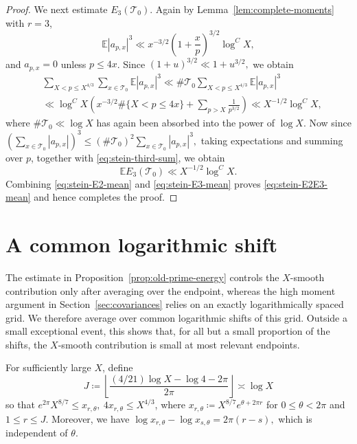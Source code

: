 \documentclass[a4paper,12pt,reqno]{amsart}
\numberwithin{equation}{section}
\theoremstyle{remark}
\newcommand{\E}{\mathbb{E}}
\begin{document}
\begin{proof}
We next estimate \(E_3(\mathcal T_0)\). Again by
Lemma~\ref{lem:complete-moments} with  $r=3$,
\[
 \E|a_{p,x}|^3
 \ll
 x^{-3/2}
 \left(1+\frac{x}{p}\right)^{3/2}
 \log^C X,
\]
and \(a_{p,x}=0\) unless \(p\leq4x\). Since
\(
 (1+u)^{3/2}\ll1+u^{3/2},
\)
we obtain
\begin{equation}\label{eq:stein-third-sum}
\begin{aligned}
 &\sum_{X<p\leq X^{4/3}}
 \sum_{x\in\mathcal T_0}\E|a_{p,x}|^3
 \ll \#\mathcal T_0 \sum_{X<p\leq X^{4/3}}\E|a_{p,x}|^3\\
 &\ll
 \log^C X
 \left(
 x^{-3/2}\#\{X<p\leq4x\}
 +
 \sum_{p>X}\frac1{p^{3/2}}
 \right)
 \ll X^{-1/2}\log^C X,
 \end{aligned}
\end{equation}
where  \(\#\mathcal T_0\ll\log X\) has again been absorbed
into the power of \(\log X\).
Now
since
\(
 \left(\sum_{x\in\mathcal T_0}|a_{p,x}|\right)^3
 \leq
 (\#\mathcal T_0)^2
 \sum_{x\in\mathcal T_0}|a_{p,x}|^3,
\)
taking expectations and summing over \(p\), together with
\eqref{eq:stein-third-sum}, we obtain
\begin{equation}\label{eq:stein-E3-mean}
 \E E_3(\mathcal T_0)
 \ll X^{-1/2}\log^C X.
\end{equation}
Combining \eqref{eq:stein-E2-mean} and
\eqref{eq:stein-E3-mean} proves \eqref{eq:stein-E2E3-mean} and hence completes the proof.
\end{proof}

\section{A common logarithmic shift}\label{sec:common-shift}
The estimate in Proposition~\ref{prop:old-prime-energy} controls the
\(X\)-smooth contribution only after averaging over the endpoint, whereas
the high moment argument in Section~\ref{sec:covariances} relies on an
exactly logarithmically spaced grid. We therefore average over common
logarithmic shifts of this grid. Outside a small exceptional event, this
shows that, for all but a small proportion of the shifts, the \(X\)-smooth
contribution is small at most relevant endpoints.

For sufficiently large \(X\), define
\[
 J\coloneqq
 \left\lfloor
 \frac{(4/21)\log X-\log4-2\pi}{2\pi}
 \right\rfloor\asymp\log X
\]
so that $ e^{2\pi}X^{8/7}\leq x_{r,\theta},
\ 4x_{r,\theta}\leq X^{4/3}$, where $ x_{r,\theta}\coloneqq X^{8/7}e^{\theta+2\pi r}$ for \(0\leq\theta<2\pi\) and \(1\leq r\leq J\).
Moreover, we have
\(
 \log x_{r,\theta}-\log x_{s,\theta}=2\pi(r-s),
\) which is
independent of \(\theta\).
\end{document}
